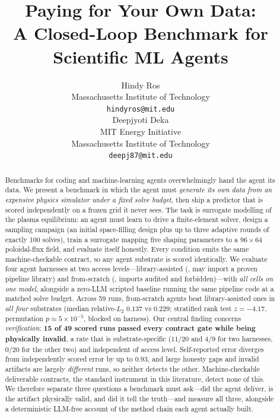 \documentclass{article}
\title{Paying for Your Own Data:\\A Closed-Loop Benchmark for Scientific ML Agents}
\author{%
  Hindy Ros \\
  Massachusetts Institute of Technology \\
  \texttt{hindyros@mit.edu} \\
  \And
  Deepjyoti Deka \\
  MIT Energy Initiative \\
  Massachusetts Institute of Technology \\
  \texttt{deepj87@mit.edu} \\
}
\begin{document}
\maketitle

\begin{abstract}
Benchmarks for coding and machine-learning agents overwhelmingly hand the agent
its data. We present a benchmark in which the agent must \emph{generate its own
data from an expensive physics simulator under a fixed solve budget}, then ship
a predictor that is scored independently on a frozen grid it never sees. The
task is surrogate modelling of the \GS{} plasma equilibrium: an agent must learn
to drive a finite-element solver, design a sampling campaign (an initial
space-filling design plus up to three adaptive rounds of exactly 100 solves),
train a surrogate mapping five shaping parameters to a $96\times64$
poloidal-flux field, and evaluate itself honestly. Every condition emits the
same machine-checkable contract, so any agent substrate is scored identically.
We evaluate four agent harnesses at two access levels---library-assisted
(\Ltwo{}, may import a proven pipeline library) and from-scratch (\Lthree{},
imports audited and forbidden)---with \emph{all cells on one model}, alongside
a zero-LLM scripted baseline running the same pipeline code at a matched solve
budget.
Across 59 runs, from-scratch agents beat library-assisted ones in \emph{all
four} substrates (median relative-$L_2$ $0.137$ vs $0.229$; stratified rank test
$z = -4.17$, permutation $p \approx 5\times10^{-5}$, blocked on harness). Our
central finding concerns \emph{verification}: \textbf{15 of 49 scored runs
passed every contract gate while being physically invalid}, a rate that is
substrate-specific ($11/20$ and $4/9$ for two harnesses, $0/20$ for the other
two) and independent of access level. Self-reported error diverges from
independently scored error by up to $0.93$, and large honesty gaps and invalid
artifacts are largely \emph{different} runs, so neither detects the other.
Machine-checkable deliverable contracts, the standard instrument in this
literature, detect none of this. We therefore separate three questions a
benchmark must ask---did the agent deliver, is the artifact physically valid,
and did it tell the truth---and measure all three, alongside a deterministic
LLM-free account of the method chain each agent actually built.
\end{abstract}










\end{document}
